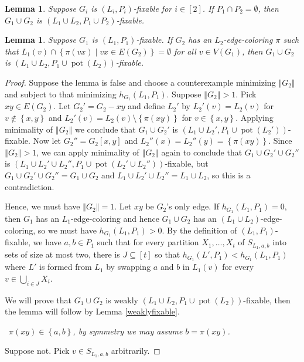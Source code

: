 \documentclass[12pt]{article}
\theoremstyle{plain}
\newtheorem{lem}[thm]{Lemma}
\theoremstyle{definition}
\theoremstyle{remark}
\newcommand{\set}[1]{\left\{ #1 \right\}}
\newcommand{\setbs}[2]{\left\{ #1 \mid #2 \right\}}
\newcommand{\size}[1]{\left\Vert#1\right\Vert}
\newcommand{\irange}[1]{\left[#1\right]}
\newcommand{\pot}{\operatorname{pot}}
\newcommand{\claim}[2]{{\bf Claim #1.}~{\it #2}~~}
\begin{document}
\begin{lem}
Suppose $G_i$ is $(L_i, P_i)$-fixable for $i \in \irange{2}$.  If $P_1 \cap P_2 = \emptyset$, then $G_1 \cup G_2$ is $(L_1 \cup L_2, P_1 \cup P_2)$-fixable.
\end{lem}
\begin{lem}
Suppose $G_1$ is $(L_1, P_1)$-fixable.  If $G_2$ has an $L_2$-edge-coloring $\pi$ such that $L_1(v) \cap \setbs{\pi(vx)}{vx \in E(G_2)} = \emptyset$ for all $v \in V(G_1)$, then $G_1 \cup G_2$ is $(L_1 \cup L_2, P_1 \cup \pot(L_2))$-fixable.
\end{lem}
\begin{proof}
Suppose the lemma is false and choose a counterexample minimizing $\size{G_2}$ and subject to that minimizing $h_{G_1}(L_1, P_1)$.  Suppose $\size{G_2} > 1$. Pick $xy \in E(G_2)$.  Let $G_2' = G_2 - xy$ and define $L_2'$ by $L_2'(v) = L_2(v)$ for $v \not \in \set{x,y}$ and $L_2'(v) = L_2(v) \setminus \set{\pi(xy)}$ for $v \in \set{x,y}$.  Applying minimality of $\size{G_2}$ we conclude that $G_1 \cup G_2'$ is $(L_1 \cup L_2', P_1 \cup \pot(L_2'))$-fixable.  Now let $G_2'' = G_2[x,y]$ and $L_2''(x) = L_2''(y) = \set{\pi(xy)}$.  Since $\size{G_2} > 1$, we can apply minimality of $\size{G_2}$ again to conclude that $G_1 \cup G_2' \cup G_2''$ is $(L_1 \cup L_2' \cup L_2'', P_1 \cup \pot(L_2' \cup L_2''))$-fixable, but $G_1 \cup G_2' \cup G_2'' = G_1 \cup G_2$ and $L_1 \cup L_2' \cup L_2'' = L_1 \cup L_2$, so this is a contradiction.

Hence, we must have $\size{G_2} = 1$. Let $xy$ be $G_2$'s only edge. If $h_{G_1}(L_1, P_1) = 0$, then $G_1$ has an $L_1$-edge-coloring and hence $G_1 \cup G_2$ has an $(L_1 \cup L_2)$-edge-coloring, so we must have $h_{G_1}(L_1, P_1) > 0$.  By the definition of $(L_1, P_1)$-fixable, we have $a,b \in P_1$ such that for every partition $X_1, \ldots, X_t$ of $S_{L_1,a,b}$ into sets of size at most two, 
there is $J \subseteq \irange{t}$ so that $h_{G_1}(L', P_1) < h_{G_1}(L_1, P_1)$ where $L'$ is formed from $L_1$ by swapping $a$ and $b$ in $L_1(v)$ for every $v \in \bigcup_{i \in J} X_i$.

We will prove that $G_1 \cup G_2$ is weakly $(L_1 \cup L_2, P_1 \cup \pot(L_2))$-fixable, then the lemma will follow by Lemma \ref{weaklyfixable}.  

\noindent\claim{1}{$\pi(xy) \in \set{a,b}$, by symmetry we may assume $b = \pi(xy)$.}

Suppose not. Pick $v \in S_{L_1,a,b}$ arbitrarily.

\end{proof}
\end{document}
